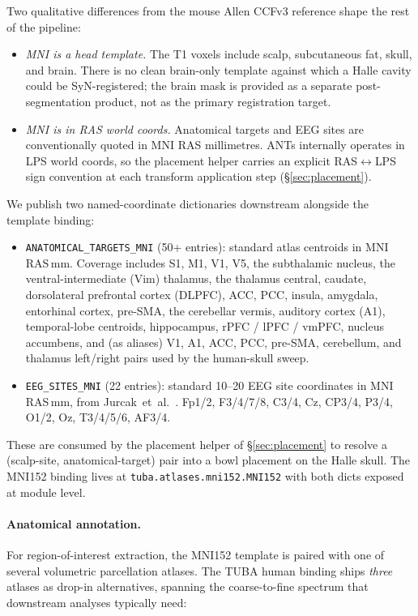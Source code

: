 \documentclass{compactarticle}
\begin{document}
Two qualitative differences from the mouse Allen CCFv3 reference shape the
rest of the pipeline:

\begin{itemize}
\item {\em MNI is a head template.} The T1 voxels include scalp,
  subcutaneous fat, skull, and brain. There is no clean brain-only
  template against which a Halle cavity could be SyN-registered; the
  brain mask is provided as a separate post-segmentation product, not
  as the primary registration target.
\item {\em MNI is in RAS world coords.} Anatomical targets and EEG sites
  are conventionally quoted in MNI RAS millimetres. ANTs internally
  operates in LPS world coords, so the placement helper carries an
  explicit RAS$\leftrightarrow$LPS sign convention at each transform
  application step (\S\ref{sec:placement}).
\end{itemize}

We publish two named-coordinate dictionaries downstream alongside the
template binding:

\begin{itemize}
\item \texttt{ANATOMICAL\_TARGETS\_MNI} (50+ entries): standard atlas
  centroids in MNI RAS\,mm. Coverage includes S1, M1, V1, V5,
  the subthalamic nucleus, the ventral-intermediate (Vim) thalamus, the
  thalamus central, caudate, dorsolateral prefrontal cortex (DLPFC), ACC,
  PCC, insula, amygdala, entorhinal cortex, pre-SMA, the cerebellar
  vermis, auditory cortex (A1), temporal-lobe centroids, hippocampus,
  rPFC / lPFC / vmPFC, nucleus accumbens, and (as aliases) V1, A1, ACC,
  PCC, pre-SMA, cerebellum, and thalamus left/right pairs used by the
  human-skull sweep.
\item \texttt{EEG\_SITES\_MNI} (22 entries): standard 10--20 EEG site
  coordinates in MNI RAS\,mm, from Jurcak~et~al.~\cite{jurcak2007}.
  Fp1/2, F3/4/7/8, C3/4, Cz, CP3/4, P3/4, O1/2, Oz, T3/4/5/6, AF3/4.
\end{itemize}

These are consumed by the placement helper of \S\ref{sec:placement} to
resolve a (scalp-site, anatomical-target) pair into a bowl placement on
the Halle skull. The MNI152 binding lives at
\texttt{tuba.atlases.mni152.MNI152} with both dicts exposed at module level.

\paragraph{Anatomical annotation.}
For region-of-interest extraction, the MNI152 template is paired with
one of several volumetric parcellation atlases. The TUBA human binding
ships {\em three} atlases as drop-in alternatives, spanning the
coarse-to-fine spectrum that downstream analyses typically need:
\end{document}
